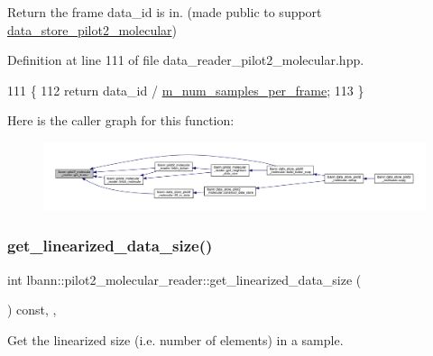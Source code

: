 Return the frame data\+\_\+id is in. (made public to support \hyperlink{classlbann_1_1data__store__pilot2__molecular}{data\+\_\+store\+\_\+pilot2\+\_\+molecular}) 

Definition at line 111 of file data\+\_\+reader\+\_\+pilot2\+\_\+molecular.\+hpp.


\begin{DoxyCode}
111                                    \{
112     \textcolor{keywordflow}{return} data\_id / \hyperlink{classlbann_1_1pilot2__molecular__reader_a1aa5896276d8a0576f7b3c2b955130be}{m\_num\_samples\_per\_frame};
113   \}
\end{DoxyCode}
Here is the caller graph for this function\+:\nopagebreak
\begin{figure}[H]
\begin{center}
\leavevmode
\includegraphics[width=350pt]{classlbann_1_1pilot2__molecular__reader_ac95223a0829a83a5d400c4d66efdcb93_icgraph}
\end{center}
\end{figure}
\mbox{\label{classlbann_1_1pilot2__molecular__reader_ad8d83938c6878019dd0c5945483e0504}} 
\subsubsection{\texorpdfstring{get\+\_\+linearized\+\_\+data\+\_\+size()}{get\_linearized\_data\_size()}}
{\footnotesize\ttfamily int lbann\+::pilot2\+\_\+molecular\+\_\+reader\+::get\+\_\+linearized\+\_\+data\+\_\+size (\begin{DoxyParamCaption}{ }\end{DoxyParamCaption}) const\hspace{0.3cm}{\ttfamily [inline]}, {\ttfamily [override]}, {\ttfamily [virtual]}}



Get the linearized size (i.\+e. number of elements) in a sample. 



